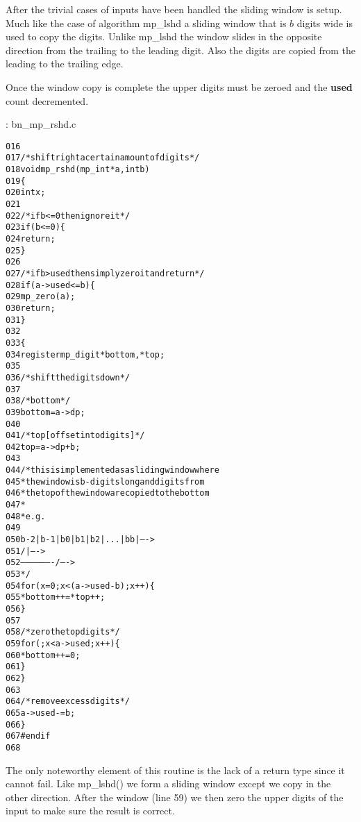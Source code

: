 \documentclass[b5paper]{book}
\begin{document}
After the trivial cases of inputs have been handled the sliding window is setup.  Much like the case of algorithm mp\_lshd a sliding window that
is $b$ digits wide is used to copy the digits.  Unlike mp\_lshd the window slides in the opposite direction from the trailing to the leading digit.  
Also the digits are copied from the leading to the trailing edge.

Once the window copy is complete the upper digits must be zeroed and the \textbf{used} count decremented.

\vspace{+3mm}\begin{small}
\hspace{-5.1mm}{\bf File}: bn\_mp\_rshd.c
\vspace{-3mm}
\begin{alltt}
016   
017   /* shift right a certain amount of digits */
018   void mp_rshd (mp_int * a, int b)
019   \{
020     int     x;
021   
022     /* if b <= 0 then ignore it */
023     if (b <= 0) \{
024       return;
025     \}
026   
027     /* if b > used then simply zero it and return */
028     if (a->used <= b) \{
029       mp_zero (a);
030       return;
031     \}
032   
033     \{
034       register mp_digit *bottom, *top;
035   
036       /* shift the digits down */
037   
038       /* bottom */
039       bottom = a->dp;
040   
041       /* top [offset into digits] */
042       top = a->dp + b;
043   
044       /* this is implemented as a sliding window where 
045        * the window is b-digits long and digits from 
046        * the top of the window are copied to the bottom
047        *
048        * e.g.
049   
050        b-2 | b-1 | b0 | b1 | b2 | ... | bb |   ---->
051                    /                   |      ---->
052                     -------------------/      ---->
053        */
054       for (x = 0; x < (a->used - b); x++) \{
055         *bottom++ = *top++;
056       \}
057   
058       /* zero the top digits */
059       for (; x < a->used; x++) \{
060         *bottom++ = 0;
061       \}
062     \}
063     
064     /* remove excess digits */
065     a->used -= b;
066   \}
067   #endif
068   
\end{alltt}
\end{small}

The only noteworthy element of this routine is the lack of a return type since it cannot fail.  Like mp\_lshd() we
form a sliding window except we copy in the other direction.  After the window (line 59) we then zero
the upper digits of the input to make sure the result is correct.
\end{document}
